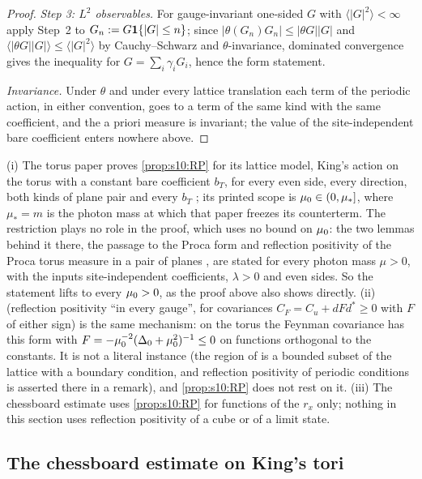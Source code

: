 \begin{proof}
\emph{Step 3: $L^2$ observables.} For gauge-invariant one-sided $G$ with $\langle|G|^2\rangle<\infty$ apply Step~2 to $G_n:= G\mathbf 1\{|G|\le n\}$; since $|\theta(G_n)G_n|\le|\theta G||G|$ and $\langle|\theta G||G|\rangle\le\langle|G|^2\rangle$ by Cauchy--Schwarz and $\theta$-invariance, dominated convergence gives the inequality for $G=\sum_i\gamma_iG_i$, hence the form statement.

\emph{Invariance.} Under $\theta$ and under every lattice translation each term of the periodic action, in either convention, goes to a term of the same kind with the same coefficient, and the a priori measure is invariant; the value of the site-independent bare coefficient enters nowhere above.
\end{proof}

\begin{remark}
(i) The torus paper \cite{SymPhase} proves \cref{prop:s10:RP} for its lattice model, King's action on the torus with a constant bare coefficient $b_T$, for every even side, every direction, both kinds of plane pair and every $b_T$ \cite[Prop.~7.9(a)]{SymPhase}; its printed scope is $\mu_0\in(0,\mu_*]$, where $\mu_*=m$ is the photon mass at which that paper freezes its counterterm. The restriction plays no role in the proof, which uses no bound on $\mu_0$: the two lemmas behind it there, the passage to the Proca form \cite[Lemma~7.7]{SymPhase} and reflection positivity of the Proca torus measure in a pair of planes \cite[Lemma~7.8(ii)]{SymPhase}, are stated for every photon mass $\mu>0$, with the inputs site-independent coefficients, $\lambda>0$ and even sides. So the statement lifts to every $\mu_0>0$, as the proof above also shows directly. (ii) \cite[Cor.~5.4]{BFS1} (reflection positivity ``in every gauge'', for covariances $C_F=C_u+dFd^*\ge0$ with $F$ of either sign) is the same mechanism: on the torus the Feynman covariance has this form with $F=-\mu_0^{-2}(\Delta_0+\mu_0^2)^{-1}\le0$ on functions orthogonal to the constants. It is not a literal instance (the region of \cite[\S5]{BFS1} is a bounded subset of the lattice with a boundary condition, and reflection positivity of periodic conditions is asserted there in a remark), and \cref{prop:s10:RP} does not rest on it. (iii) The chessboard estimate uses \cref{prop:s10:RP} for functions of the $r_x$ only; nothing in this section uses reflection positivity of a cube or of a limit state.
\end{remark}

\subsection{The chessboard estimate on King's tori}


